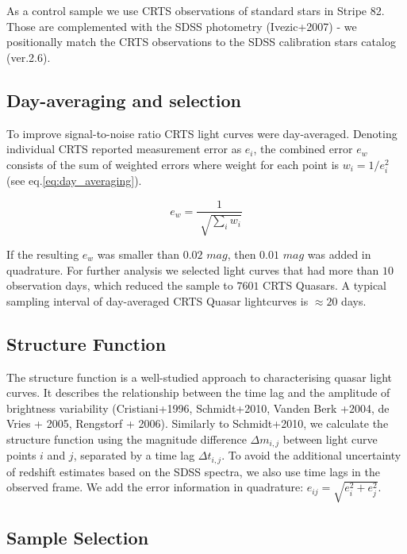 \documentclass[a4paper,fleqn,usenatbib]{mnras}
\begin{document}
As a control sample we use CRTS observations of standard stars in Stripe 82. Those are  complemented with the SDSS photometry (Ivezic+2007) - we positionally  match the CRTS observations to the SDSS calibration stars catalog (ver.2.6). 


\subsection{Day-averaging and selection}
\label{sec:sample_sel}


To improve signal-to-noise ratio CRTS light curves were day-averaged.  Denoting individual CRTS reported measurement error as $e_{i}$, the combined error $e_{w}$ consists of the sum of weighted errors where weight for each point is $ w_{i} = 1 / e_{i}^{2}$ (see eq.\ref{eq:day_averaging}). 


\begin{equation}
\label{eq:day_averaging}
 e_{w} = \frac{1}{\sqrt[]{\sum_{i} w_{i}}}
\end{equation}

If the resulting $e_{w}$ was smaller than $0.02$ $mag$, then  $0.01$ $mag$ was added in quadrature. For further analysis we selected light curves that had more than $10$ observation days, which reduced the sample to $7601$ CRTS Quasars. A typical sampling interval of day-averaged CRTS Quasar lightcurves is $\approx 20$ days. 

\subsection{Structure Function}

The structure function is a well-studied approach to characterising quasar light curves. It describes the relationship between the time lag and the amplitude of brightness variability (Cristiani+1996, Schmidt+2010, Vanden Berk +2004, de Vries + 2005, Rengstorf + 2006). Similarly to Schmidt+2010, we  calculate the structure function using  the magnitude difference $\Delta m _{i,j}$ between light curve points $i$ and $j$, separated by a time lag $\Delta t_{i,j}$. To avoid the additional uncertainty of redshift estimates based on the SDSS spectra, we also use time lags in the observed frame. We add the error information in quadrature: $e_{ij} = \sqrt{e_{i}^{2}+e_{j}^{2}}$. 



\subsection{Sample Selection}
\end{document}
